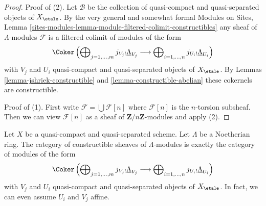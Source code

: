 \begin{proof}
Proof of (2). Let $\mathcal{B}$ be the collection of quasi-compact
and quasi-separated objects of $X_\etale$. By the very general
and somewhat formal Modules on Sites,
Lemma \ref{sites-modules-lemma-module-filtered-colimit-constructibles}
any sheaf of $\Lambda$-modules $\mathcal{F}$ is a filtered colimit
of modules of the form
$$
\Coker\left(
\bigoplus\nolimits_{j = 1, \ldots, m} j_{V_j!}\underline{\Lambda}_{V_j}
\longrightarrow
\bigoplus\nolimits_{i = 1, \ldots, n} j_{U_i!}\underline{\Lambda}_{U_i}
\right)
$$
with $V_j$ and $U_i$ quasi-compact and quasi-separated objects
of $X_\etale$. By
Lemmas \ref{lemma-jshriek-constructible} and \ref{lemma-constructible-abelian}
these cokernels are constructible.

\medskip\noindent
Proof of (1). First write $\mathcal{F} = \bigcup \mathcal{F}[n]$ where
$\mathcal{F}[n]$ is the $n$-torsion subsheaf. Then we can view
$\mathcal{F}[n]$ as a sheaf of $\mathbf{Z}/n\mathbf{Z}$-modules
and apply (2).
\end{proof}

\begin{proposition}
\label{proposition-category-constructible}
Let $X$ be a quasi-compact and quasi-separated scheme. Let $\Lambda$
be a Noetherian ring. The category of constructible sheaves of
$\Lambda$-modules is exactly the category of modules of the form
$$
\Coker\left(
\bigoplus\nolimits_{j = 1, \ldots, m} j_{V_j!}\underline{\Lambda}_{V_j}
\longrightarrow
\bigoplus\nolimits_{i = 1, \ldots, n} j_{U_i!}\underline{\Lambda}_{U_i}
\right)
$$
with $V_j$ and $U_i$ quasi-compact and quasi-separated objects of
$X_\etale$. In fact, we can even assume $U_i$ and $V_j$ affine.
\end{proposition}

